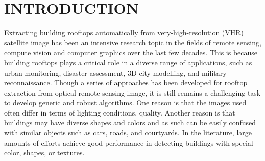 \section{INTRODUCTION}
\label{sec:intro}
	Extracting building rooftops automatically from very-high-resolution (VHR) satellite image has been an intensive research topic in the fields of remote sensing, compute vision  and computer graphics  over the last few decades. This is because building rooftops plays a critical role in  a diverse range of applications, such as  urban monitoring, disaster assessment, 3D city modelling, and military reconnaissance. Though a series of approaches has been developed for rooftop extraction from optical remote sensing image, it is still remains a challenging task to develop generic and robust algorithms. One reason is that the images used often differ in terms of lighting conditions, quality.  Another reason is that buildings may have diverse shapes and colors and as such can be easily confused with similar objects such as cars, roads, and courtyards. In the literature, large amounts of efforts achieve good performance in detecting buildings with special color, shapes, or textures.
	
